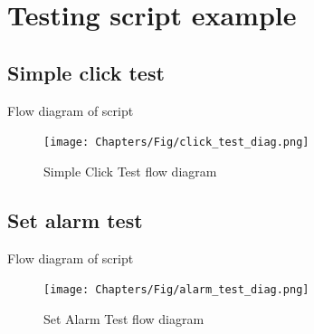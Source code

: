\section{Testing script example}
\label{sec:eg_script}
\subsection{Simple click test}
Flow diagram of script
	\begin{figure}[H]
		\centering
		\texttt{[image: Chapters/Fig/click\_test\_diag.png]}
		\caption{Simple Click Test flow diagram}
		\label{fig:click_test_diag}
	\end{figure}

\subsection{Set alarm test}
Flow diagram of script
	\begin{figure}[H]
		\centering
		\texttt{[image: Chapters/Fig/alarm\_test\_diag.png]}
		\caption{Set Alarm Test flow diagram}
		\label{fig:alarm_test_diag}
	\end{figure}
